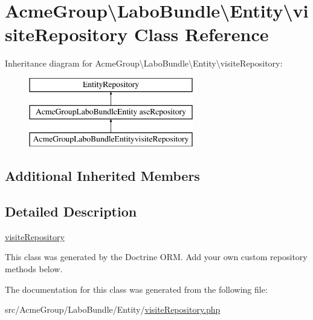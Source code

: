 \hypertarget{class_acme_group_1_1_labo_bundle_1_1_entity_1_1visite_repository}{\section{Acme\+Group\textbackslash{}Labo\+Bundle\textbackslash{}Entity\textbackslash{}visite\+Repository Class Reference}
\label{class_acme_group_1_1_labo_bundle_1_1_entity_1_1visite_repository}
}
Inheritance diagram for Acme\+Group\textbackslash{}Labo\+Bundle\textbackslash{}Entity\textbackslash{}visite\+Repository\+:\begin{figure}[H]
\begin{center}
\leavevmode
\includegraphics[height=3.000000cm]{class_acme_group_1_1_labo_bundle_1_1_entity_1_1visite_repository}
\end{center}
\end{figure}
\subsection*{Additional Inherited Members}


\subsection{Detailed Description}
\hyperlink{class_acme_group_1_1_labo_bundle_1_1_entity_1_1visite_repository}{visite\+Repository}

This class was generated by the Doctrine O\+R\+M. Add your own custom repository methods below. 

The documentation for this class was generated from the following file\+:\begin{DoxyCompactItemize}
\item 
src/\+Acme\+Group/\+Labo\+Bundle/\+Entity/\hyperlink{visite_repository_8php}{visite\+Repository.\+php}\end{DoxyCompactItemize}
